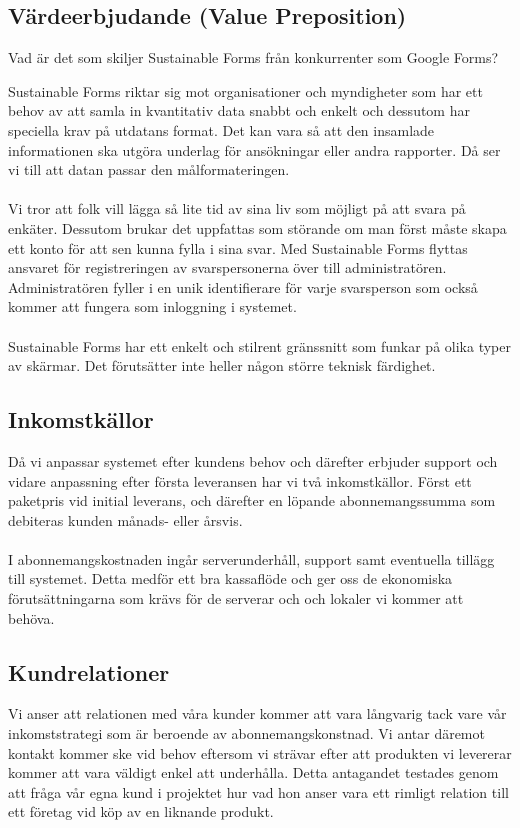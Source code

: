 \documentclass[12pt]{article}
\begin{document}
\subsection{Värdeerbjudande (Value Preposition)}

Vad är det som skiljer Sustainable Forms från konkurrenter som Google Forms?

Sustainable Forms riktar sig mot organisationer och myndigheter som har ett behov av att samla in kvantitativ data snabbt och enkelt och dessutom har speciella krav på utdatans format. Det kan vara så att den insamlade informationen ska utgöra underlag för ansökningar eller andra rapporter. Då ser vi till att datan passar den målformateringen. \\\\
Vi tror att folk vill lägga så lite tid av sina liv som möjligt på att svara på enkäter. Dessutom brukar det uppfattas som störande om man först måste skapa ett konto för att sen kunna fylla i sina svar. Med Sustainable Forms flyttas ansvaret för registreringen av svarspersonerna över till administratören. Administratören fyller i en unik identifierare för varje svarsperson som också kommer att fungera som inloggning i systemet.\\\\
Sustainable Forms har ett enkelt och stilrent gränssnitt som funkar på olika typer av skärmar. Det förutsätter inte heller någon större teknisk färdighet.


\subsection{Inkomstkällor}
Då vi anpassar systemet efter kundens behov och därefter erbjuder support och vidare anpassning efter första leveransen har vi två inkomstkällor. Först ett paketpris vid initial leverans, och därefter en löpande abonnemangssumma som debiteras kunden månads- eller årsvis. \\\\
I abonnemangskostnaden ingår serverunderhåll, support samt eventuella tillägg till systemet. Detta medför ett bra kassaflöde och ger oss de ekonomiska förutsättningarna som krävs för de serverar och och lokaler vi kommer att behöva.


\subsection{Kundrelationer}
Vi anser att relationen med våra kunder kommer att vara långvarig tack vare vår inkomststrategi som är beroende av abonnemangskonstnad. Vi antar däremot kontakt kommer ske vid behov eftersom vi strävar efter att produkten vi levererar kommer att vara väldigt enkel att underhålla. Detta antagandet testades genom att fråga vår egna kund i projektet hur vad hon anser vara ett rimligt relation till ett företag vid köp av en liknande produkt.
\end{document}
